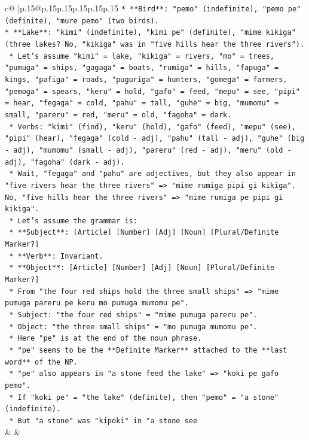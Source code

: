 \documentclass{article}
\begin{document}
{\begin{supertabular}{c@{$\;$}|p{.15\linewidth}@{}p{.15\linewidth}p{.15\linewidth}p{.15\linewidth}p{.15\linewidth}p{.15\linewidth}}
{{{\texttt{*   **Bird**: "pemo" (indefinite), "pemo pe" (definite), "mure pemo" (two birds).} \\
\texttt{*   **Lake**: "kimi" (indefinite), "kimi pe" (definite), "mime kikiga" (three lakes? No, "kikiga" was in "five hills hear the three rivers").} \\
\texttt{    *   Let's assume "kimi" = lake, "kikiga" = rivers, "mo" = trees, "pumuga" = ships, "gagaga" = boats, "rumiga" = hills, "fapuga" = kings, "pafiga" = roads, "puguriga" = hunters, "gomega" = farmers, "pemoga" = spears, "keru" = hold, "gafo" = feed, "mepu" = see, "pipi" = hear, "fegaga" = cold, "pahu" = tall, "guhe" = big, "mumomu" = small, "pareru" = red, "meru" = old, "fagoha" = dark.} \\
\texttt{    *   Verbs: "kimi" (find), "keru" (hold), "gafo" (feed), "mepu" (see), "pipi" (hear), "fegaga" (cold {-} adj), "pahu" (tall {-} adj), "guhe" (big {-} adj), "mumomu" (small {-} adj), "pareru" (red {-} adj), "meru" (old {-} adj), "fagoha" (dark {-} adj).} \\
\texttt{    *   Wait, "fegaga" and "pahu" are adjectives, but they also appear in "five rivers hear the three rivers" => "mime rumiga pipi gi kikiga". No, "five hills hear the three rivers" => "mime rumiga pe pipi gi kikiga".} \\
\texttt{    *   Let's assume the grammar is:} \\
\texttt{        *   **Subject**: {[}Article{]} {[}Number{]} {[}Adj{]} {[}Noun{]} {[}Plural/Definite Marker?{]}} \\
\texttt{        *   **Verb**: Invariant.} \\
\texttt{        *   **Object**: {[}Article{]} {[}Number{]} {[}Adj{]} {[}Noun{]} {[}Plural/Definite Marker?{]}} \\
\texttt{    *   From "the four red ships hold the three small ships" => "mime pumuga pareru pe keru mo pumuga mumomu pe".} \\
\texttt{        *   Subject: "the four red ships" = "mime pumuga pareru pe".} \\
\texttt{        *   Object: "the three small ships" = "mo pumuga mumomu pe".} \\
\texttt{        *   Here "pe" is at the end of the noun phrase.} \\
\texttt{        *   "pe" seems to be the **Definite Marker** attached to the **last word** of the NP.} \\
\texttt{        *   "pe" also appears in "a stone feed the lake" => "koki pe gafo pemo".} \\
\texttt{            *   If "koki pe" = "the lake" (definite), then "pemo" = "a stone" (indefinite).} \\
\texttt{            *   But "a stone" was "kipoki" in "a stone see} \\
            }
        }
    }
    & & \\ \\


\end{supertabular}}
\end{document}
